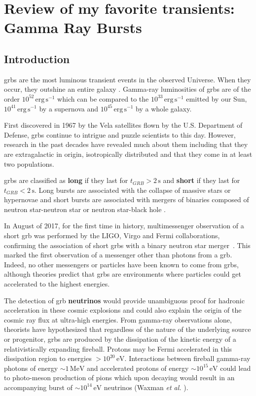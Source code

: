 \chapter{Review of my favorite transients: Gamma Ray Bursts}
\label{grb}

\section{Introduction}

\gls{grbs} are the most luminous transient events in the observed Universe. When they occur, they outshine an entire galaxy \cite{Meszaros,MBthesis}. 
Gamma-ray luminosities of \gls{grbs} are of the order $10^{52} \, \mathrm{erg \, s^{-1}}$ which can be compared to the $10^{33} \, \mathrm{erg \, s^{-1}}$ emitted by our Sun, $10^{41} \, \mathrm{erg \, s^{-1}}$ by a supernova and $10^{45} \, \mathrm{erg \, s^{-1}}$ by a whole galaxy. 

First discovered in 1967 by the Vela satellites flown by the U.S. Department of Defense, \gls{grbs} continue to intrigue and puzzle scientists to this day.
However, research in the past decades have revealed much about them including that they are extragalactic in origin, isotropically distributed and that they come in at least two populations.

\gls{grbs} are classified as {\bf long} if they last for $t_{GRB} > 2 \, \mathrm{s}$ and {\bf short} if they last for $t_{GRB} < 2 \, \mathrm{s}$. Long bursts are associated with the collapse of massive stars or hypernovae and short bursts are associated with mergers of binaries composed of neutron star-neutron star or neutron star-black hole \cite{Meszaros}. 

In August of 2017, for the first time in history, multimessenger observation of a short \gls{grb} was performed by the LIGO, Virgo and Fermi collaborations, confirming the association of short \gls{grbs} with a binary neutron star merger~\cite{ligo_short}. This marked the first observation of a messenger other than photons from a \gls{grb}. Indeed, no other messengers or particles have been known to come from \gls{grbs}, although theories predict that \gls{grbs} are environments where particles could get accelerated to the highest energies.

The detection of \gls{grb} {\bf neutrinos} would provide unambiguous proof for hadronic acceleration in these cosmic explosions and could also explain the origin of the cosmic ray flux at ultra-high energies.
From gamma-ray observations alone, theorists have hypothesized that regardless of the nature of the underlying source or progenitor, \gls{grbs} are produced by the dissipation of the kinetic energy of a relativistically expanding fireball. Protons may be Fermi accelerated in this dissipation region to energies $> 10^{20} \, \mathrm{eV}$. Interactions between fireball gamma-ray photons of energy $\sim 1 \, \mathrm{MeV}$ and accelerated protons of energy $\sim 10^{15} \, \mathrm{eV}$ could lead to photo-meson production of pions which upon decaying would result in an accompanying burst of $\sim 10^{14} \, \mathrm{eV}$ neutrinos (Waxman \textit{et al.} \cite{Waxmanreview,firstcalc}). 


